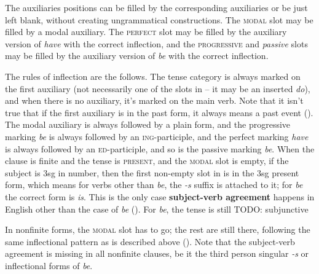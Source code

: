 \documentclass[UTF8, a4paper, oneside, scheme=plain]{ctexrep}
\newcommand*{\concept}[1]{\textbf{#1}}
\newcommand{\corpus}[1]{\emph{#1}}
\newcommand{\category}[1]{\textsc{#1}}
\newcommand{\corpuscat}[1]{\textsc{#1}}
\begin{document}
The auxiliaries positions can be filled by the corresponding auxiliaries or be just left blank,
without creating ungrammatical constructions.
The \category{modal} slot may be filled by a modal auxiliary.
The \category{perfect} slot may be filled by the auxiliary version of \corpus{have} with the correct inflection,
and the \category{progressive} and \corpus{passive} slots 
may be filled by the auxiliary version of \corpus{be} with the correct inflection.

The rules of inflection are the follows.
The tense category is always marked on the first auxiliary
(not necessarily one of the slots in 
-- it may be an inserted \corpus{do}),
and when there is no auxiliary,
it's marked on the main verb.
Note that it isn't true that if the first auxiliary is in the past form,
it always means a past event ().
The modal auxiliary is always followed by a plain form,
and the progressive marking \corpus{be} is always followed by an \corpuscat{ing}-participle,
and the perfect marking \corpus{have} is always followed by an \corpuscat{ed}-participle,
and so is the passive marking \corpus{be}.
When the clause is finite and the tense is \category{present},
and the \category{modal} slot is empty,
if the subject is 3sg in number,
then the first non-empty slot in 
is in the 3sg present form,
which means for verbs other than \corpus{be}, the \corpus{-s} suffix is attached to it;
for \corpus{be} the correct form is \corpus{is}.
This is the only case \concept{subject-verb agreement} happens in English 
other than the case of \corpus{be} ().
For \corpus{be}, the tense is still  TODO: subjunctive 

In nonfinite forms, the \category{modal} slot has to go;
the rest are still there, following the same inflectional pattern as is described above
().
Note that the subject-verb agreement is missing in all nonfinite clauses,
be it the third person singular \corpus{-s} or inflectional forms of \corpus{be}.
\end{document}
